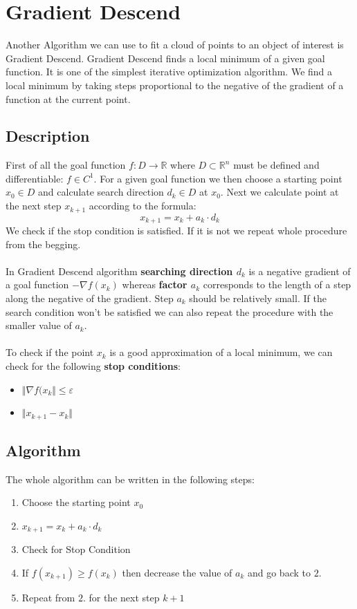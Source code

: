 \documentclass{book}
\begin{document}
\chapter{Gradient Descend}
Another Algorithm we can use to fit a cloud of points to an object of interest is Gradient Descend. Gradient Descend finds a local minimum of a given goal function. It is one of the simplest iterative optimization algorithm. We find a local minimum by taking steps proportional to the negative of the gradient of a function at the current point.

\section{Description}
First of all the goal function $f:D \rightarrow \mathbb{R}$ where $D \subset \mathbb{R}^n$ must be defined and differentiable: $f \in C^1$.
For a given goal function we then choose a starting point $x_0 \in D$ and calculate search direction $d_k \in D$ at $x_0$. Next we calculate point at the next step $x_{k+1}$ according to the formula: $$x_{k+1} = x_k + a_k \cdot d_k$$
We check if the stop condition is satisfied. If it is not we repeat whole procedure from the begging. 
\\
\\
In Gradient Descend algorithm \textbf{searching direction $d_k$} is a negative gradient of a goal function $-\nabla f(x_k)$ whereas \textbf{factor $a_k$} corresponds to the length of a step along the negative of the gradient. Step $a_k$ should be relatively small. If the search condition won't be satisfied we can also repeat the procedure with the smaller value of $a_k$.
\\
\\ 
To check if the point $x_k$ is a good approximation of a local minimum, we can check for the following \textbf{stop conditions}:
\begin{itemize}
\item $\Vert \nabla f(x_k \Vert \leq \varepsilon$
\item $\Vert x_{k+1} - x_k \Vert$
\end{itemize}

\section{Algorithm}
The whole algorithm can be written in the following steps:
\begin{enumerate}
\item Choose the starting point $x_0$
\item $x_{k+1} = x_k + a_k \cdot d_k$
\item Check for Stop Condition
\item If $f(x_{k+1}) \geq f(x_k)$ then decrease the value of $a_k$ and go back to $2.$
\item Repeat from $2.$ for the next step $k+1$
\end{enumerate}
\end{document}
